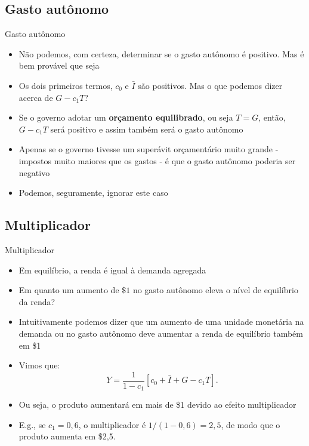 \documentclass[10pt]{beamer}
\begin{document}
\subsection{Gasto autônomo}
\begin{frame}{Gasto autônomo}
    \begin{itemize}
        \item Não podemos, com certeza, determinar se o gasto autônomo é positivo. Mas é bem provável que seja\bigskip
         
        \item Os dois primeiros termos, $c_0$ e $\bar{I}$ são positivos. Mas o que podemos dizer acerca de $G-c_1T$?\bigskip
         
        \item Se o governo adotar um \textbf{orçamento equilibrado}, ou seja $T = G$, então, $G-c_1T$ será positivo e assim também será o gasto autônomo\bigskip
         
        \item Apenas se o governo tivesse um superávit orçamentário muito grande - impostos muito maiores que os gastos - é que o gasto autônomo poderia ser negativo\bigskip
         
        \item Podemos, seguramente, ignorar este caso
    \end{itemize}
\end{frame}

\subsection{Multiplicador}
\begin{frame}{Multiplicador}
    \begin{itemize}
        \item Em equilíbrio, a renda é igual à demanda agregada\bigskip
         
        \item Em quanto um aumento de $\$1$ no gasto autônomo eleva o nível de equilíbrio da renda?\bigskip
         
        \item Intuitivamente podemos dizer que um aumento de uma unidade monetária na demanda ou no gasto autônomo deve aumentar a renda de equilíbrio também em \$1\bigskip
         
        \item Vimos que:
        \[
        Y = \frac{1}{1-c_1}[c_0 + \bar{I} + G - c_1T].
        \]
         
        \item Ou seja, o produto aumentará em mais de \$1 devido ao efeito multiplicador\bigskip
         
        \item E.g., se $c_1 = 0,6$, o multiplicador é $1/(1-0,6) = 2,5$, de modo que o produto aumenta em \$2,5.
    \end{itemize}
\end{frame}
\end{document}
